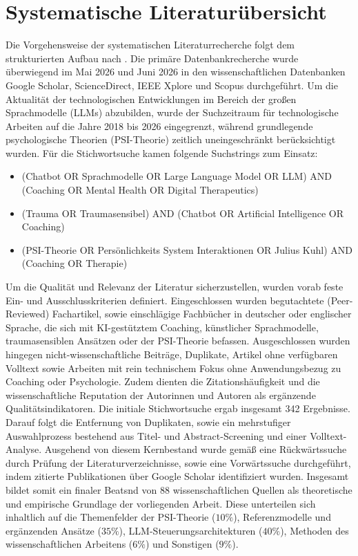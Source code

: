 \section{Systematische Literaturübersicht}
Die Vorgehensweise der systematischen Literaturrecherche folgt dem strukturierten Aufbau nach \cite{webster2002analyzing}. Die primäre Datenbankrecherche wurde überwiegend im Mai 2026 und Juni 2026 in den wissenschaftlichen Datenbanken Google Scholar, ScienceDirect, IEEE Xplore und Scopus durchgeführt. Um die Aktualität der technologischen Entwicklungen im Bereich der großen Sprachmodelle (LLMs) abzubilden, wurde der Suchzeitraum für technologische Arbeiten auf die Jahre 2018 bis 2026 eingegrenzt, während grundlegende psychologische Theorien (PSI-Theorie) zeitlich uneingeschränkt berücksichtigt wurden.
Für die Stichwortsuche kamen folgende Suchstrings zum Einsatz:
\begin{itemize}
    \item \glqq (\glqq Chatbot\grqq{} OR \glqq Sprachmodelle\grqq{} OR \glqq Large Language Model\grqq{} OR \glqq LLM\grqq{}) AND (\glqq Coaching\grqq{} OR \glqq Mental Health\grqq{} OR \glqq Digital Therapeutics\grqq{})\grqq{}
    \item \glqq (\glqq Trauma\grqq{} OR \glqq Traumasensibel\grqq{}) AND (\glqq Chatbot\grqq{} OR \glqq Artificial Intelligence\grqq{} OR \glqq Coaching\grqq{})\grqq{}
    \item \glqq (\glqq PSI-Theorie\grqq{} OR \glqq Persönlichkeits System Interaktionen\grqq{} OR \glqq Julius Kuhl\grqq{}) AND (\glqq Coaching\grqq{} OR \glqq Therapie\grqq{})\grqq{}
\end{itemize}

Um die Qualität und Relevanz der Literatur sicherzustellen, wurden vorab feste Ein- und Ausschlusskriterien definiert. Eingeschlossen wurden begutachtete (Peer-Reviewed) Fachartikel, sowie einschlägige Fachbücher in deutscher oder englischer Sprache, die sich mit KI-gestütztem Coaching, künstlicher Sprachmodelle, traumasensiblen Ansätzen oder der PSI-Theorie befassen. Ausgeschlossen wurden hingegen nicht-wissenschaftliche Beiträge, Duplikate, Artikel ohne verfügbaren Volltext sowie Arbeiten mit rein technischem Fokus ohne Anwendungsbezug zu Coaching oder Psychologie. Zudem dienten die Zitationshäufigkeit und die wissenschaftliche Reputation der Autorinnen und Autoren als ergänzende Qualitätsindikatoren.
Die initiale Stichwortsuche ergab insgesamt 342 Ergebnisse. Darauf folgt die Entfernung von Duplikaten, sowie ein mehrstufiger Auswahlprozess bestehend aus Titel- und Abstract-Screening und einer Volltext-Analyse. Ausgehend von diesem Kernbestand wurde gemäß \cite{webster2002analyzing} eine Rückwärtssuche durch Prüfung der Literaturverzeichnisse, sowie eine Vorwärtssuche durchgeführt, indem zitierte Publikationen über Google Scholar identifiziert wurden. Insgesamt bildet somit ein finaler Beatsnd von 88 wissenschaftlichen Quellen als theoretische und empirische Grundlage der vorliegenden Arbeit. Diese unterteilen sich inhaltlich auf die Themenfelder der PSI-Theorie ($10\%$), Referenzmodelle und ergänzenden Ansätze ($35\%$), LLM-Steuerungsarchitekturen ($40\%$), Methoden des wissenschaftlichen Arbeitens ($6\%$) und Sonstigen ($9\%$).

